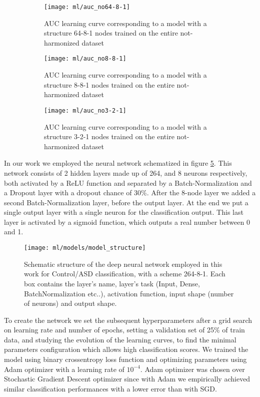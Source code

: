 \documentclass[11pt]{report}
\begin{document}
\begin{figure}
\centering
\begin{subfigure}[b]{0.3\textwidth}
   \texttt{[image: ml/auc\_no64-8-1]}
   \caption{AUC learning curve corresponding to a model with a structure 64-8-1 nodes trained on the entire not-harmonized dataset}
   \label{fig:auc_no64-8-1}
\end{subfigure}
\begin{subfigure}[b]{0.3\textwidth}
   \texttt{[image: ml/auc\_no8-8-1]}
   \caption{AUC learning curve corresponding to a model with a structure 8-8-1 nodes trained on the entire not-harmonized dataset}
   \label{fig:auc_no8-8-1}
\end{subfigure}
\begin{subfigure}[b]{0.3\textwidth}
   \texttt{[image: ml/auc\_no3-2-1]}
   \caption{AUC learning curve corresponding to a model with a structure 3-2-1 nodes trained on the entire not-harmonized dataset}
   \label{fig:auc_no3-2-1}
\end{subfigure}
\caption{}
\label{fig:learningcurve}
\end{figure}


In our work we employed the neural network schematized in figure \ref{fig:model_structure}.
This network consists of 2 hidden layers made up of 264, and 8 neurons respectively, both activated by a ReLU function and separated by a Batch-Normalization and a Dropout layer with a dropout chance of 30\%.
After the 8-node layer we added a second Batch-Normalization layer, before the output layer.
At the end we put a single output layer with a single neuron for the classification output.
This last layer is activated by a sigmoid function, which outputs a real number between 0 and 1.



\begin{figure}[h!]
\centering
\texttt{[image: ml/models/model\_structure]}
\caption{Schematic structure of the deep neural network employed in this work for Control/ASD classification, with a scheme 264-8-1.
Each box contains the layer's name, layer's task (Input, Dense, BatchNormalization etc..), activation function, input shape (number of neurons) and output shape.}
\label{fig:model_structure}
\end{figure}


To create the network we set the subsequent hyperparameters after a grid search on learning rate and number of epochs, setting a validation set of 25\% of train data, and studying the evolution of the learning curves, to find the minimal parameters configuration which allows high classification scores.
We trained the model using binary crossentropy loss function and optimizing parameters using Adam optimizer with a learning rate of $10^{-4}$.
Adam optimizer was chosen over Stochastic Gradient Descent optimizer since with Adam we empirically achieved similar classification performances with a lower error than with SGD.
\end{document}

